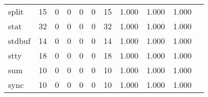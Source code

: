 \begin{longtable}{lp{1.2cm}p{1.2cm}p{1.2cm}p{1.2cm}p{1.2cm}p{1.2cm}p{1.2cm}p{1.2cm}p{1.2cm}p{1.2cm}}
split     &                                    15 &                                                  0 &                                                  0 &                                                  0 &                                                  0 &                                                 15 &                                              1.000 &                                              1.000 &                                              1.000 \\
stat      &                                    32 &                                                  0 &                                                  0 &                                                  0 &                                                  0 &                                                 32 &                                              1.000 &                                              1.000 &                                              1.000 \\
stdbuf    &                                    14 &                                                  0 &                                                  0 &                                                  0 &                                                  0 &                                                 14 &                                              1.000 &                                              1.000 &                                              1.000 \\
stty      &                                    18 &                                                  0 &                                                  0 &                                                  0 &                                                  0 &                                                 18 &                                              1.000 &                                              1.000 &                                              1.000 \\
sum       &                                    10 &                                                  0 &                                                  0 &                                                  0 &                                                  0 &                                                 10 &                                              1.000 &                                              1.000 &                                              1.000 \\
sync      &                                    10 &                                                  0 &                                                  0 &                                                  0 &                                                  0 &                                                 10 &                                              1.000 &                                              1.000 &                                              1.000 \\

\end{longtable}
